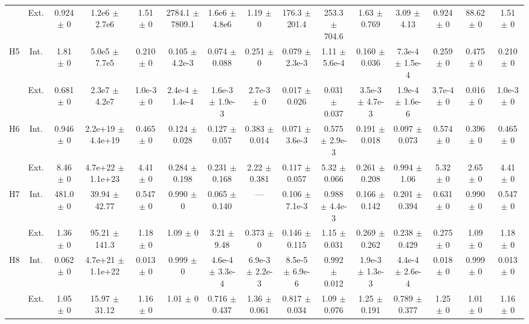 \begin{table}[htbp]
{\begin{tabular}{@{}ccccccccccccccc@{}}
 & Ext. & 0.924 $\pm$ 0 & 1.2e6 $\pm$ 2.7e6 & 1.51 $\pm$ 0 & 2784.1 $\pm$ 7809.1 & 1.6e6 $\pm$ 4.8e6 & 1.19 $\pm$ 0 & 176.3 $\pm$ 201.4 & 253.3 $\pm$ 704.6 & 1.63 $\pm$ 0.769 & 3.09 $\pm$ 4.13 & 0.924 $\pm$ 0 & 88.62 $\pm$ 0 & 1.51 $\pm$ 0 \\
\cline{2-15}
\multirow{2}{*}{H5} & Int. & 1.81 $\pm$ 0 & 5.0e5 $\pm$ 7.7e5 & 0.210 $\pm$ 0 & 0.105 $\pm$ 4.2e-3 & 0.074 $\pm$ 0.088 & 0.251 $\pm$ 0 & 0.079 $\pm$ 2.3e-3 & 1.11 $\pm$ 5.6e-4 & 0.160 $\pm$ 0.036 & 7.3e-4 $\pm$ 1.5e-4 & 0.259 $\pm$ 0 & 0.475 $\pm$ 0 & 0.210 $\pm$ 0 \\
 & Ext. & 0.681 $\pm$ 0 & 2.3e7 $\pm$ 4.2e7 & 1.0e-3 $\pm$ 0 & 2.4e-4 $\pm$ 1.4e-4 & 1.6e-3 $\pm$ 1.9e-3 & 2.7e-3 $\pm$ 0 & 0.017 $\pm$ 0.026 & 0.031 $\pm$ 0.037 & 3.5e-3 $\pm$ 4.7e-3 & 1.9e-4 $\pm$ 1.6e-6 & 3.7e-4 $\pm$ 0 & 0.016 $\pm$ 0 & 1.0e-3 $\pm$ 0 \\
\cline{2-15}
\multirow{2}{*}{H6} & Int. & 0.946 $\pm$ 0 & 2.2e+19 $\pm$ 4.4e+19 & 0.465 $\pm$ 0 & 0.124 $\pm$ 0.028 & 0.127 $\pm$ 0.057 & 0.383 $\pm$ 0.014 & 0.071 $\pm$ 3.6e-3 & 0.575 $\pm$ 2.9e-3 & 0.191 $\pm$ 0.018 & 0.097 $\pm$ 0.073 & 0.574 $\pm$ 0 & 0.396 $\pm$ 0 & 0.465 $\pm$ 0 \\
 & Ext. & 8.46 $\pm$ 0 & 4.7e+22 $\pm$ 1.1e+23 & 4.41 $\pm$ 0 & 0.284 $\pm$ 0.198 & 0.231 $\pm$ 0.168 & 2.22 $\pm$ 0.381 & 0.117 $\pm$ 0.057 & 5.32 $\pm$ 0.066 & 0.261 $\pm$ 0.208 & 0.994 $\pm$ 1.06 & 5.32 $\pm$ 0 & 2.65 $\pm$ 0 & 4.41 $\pm$ 0 \\
\cline{2-15}
\multirow{2}{*}{H7} & Int. & 481.0 $\pm$ 0 & 39.94 $\pm$ 42.77 & 0.547 $\pm$ 0 & 0.990 $\pm$ 0 & 0.065 $\pm$ 0.140 & --- & 0.106 $\pm$ 7.1e-3 & 0.988 $\pm$ 4.4e-3 & 0.166 $\pm$ 0.142 & 0.201 $\pm$ 0.394 & 0.631 $\pm$ 0 & 0.990 $\pm$ 0 & 0.547 $\pm$ 0 \\
 & Ext. & 1.36 $\pm$ 0 & 95.21 $\pm$ 141.3 & 1.18 $\pm$ 0 & 1.09 $\pm$ 0 & 3.21 $\pm$ 9.48 & 0.373 $\pm$ 0 & 0.146 $\pm$ 0.115 & 1.15 $\pm$ 0.031 & 0.269 $\pm$ 0.262 & 0.238 $\pm$ 0.429 & 0.275 $\pm$ 0 & 1.09 $\pm$ 0 & 1.18 $\pm$ 0 \\
\cline{2-15}
\multirow{2}{*}{H8} & Int. & 0.062 $\pm$ 0 & 4.7e+21 $\pm$ 1.1e+22 & 0.013 $\pm$ 0 & 0.999 $\pm$ 0 & 4.6e-4 $\pm$ 3.3e-4 & 6.9e-3 $\pm$ 2.2e-3 & 8.5e-5 $\pm$ 6.9e-6 & 0.992 $\pm$ 0.012 & 1.9e-3 $\pm$ 1.3e-3 & 4.4e-4 $\pm$ 2.6e-4 & 0.018 $\pm$ 0 & 0.999 $\pm$ 0 & 0.013 $\pm$ 0 \\
 & Ext. & 1.05 $\pm$ 0 & 15.97 $\pm$ 31.12 & 1.16 $\pm$ 0 & 1.01 $\pm$ 0 & 0.716 $\pm$ 0.437 & 1.36 $\pm$ 0.061 & 0.817 $\pm$ 0.034 & 1.09 $\pm$ 0.076 & 1.25 $\pm$ 0.191 & 0.789 $\pm$ 0.377 & 1.25 $\pm$ 0 & 1.01 $\pm$ 0 & 1.16 $\pm$ 0 \\

\end{tabular}}
\end{table}
